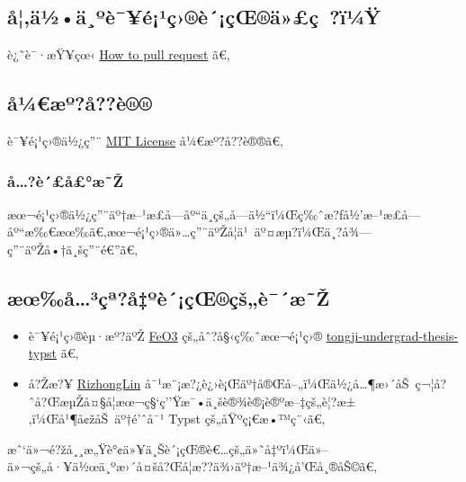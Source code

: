 \subsection{å¦‚ä½•ä¸ºè¯¥é¡¹ç›®è´¡çŒ®ä»£ç~?ï¼Ÿ}\label{uxe5uxe4uxbduxe4uxbauxe8uxe9uxb9uxe7uxe8uxe7ux153uxe4uxe7-uxefuxbcuxff}

è¿˜è¯·æŸ¥çœ‹
\href{https://github.com/typst/packages/raw/main/packages/preview/paddling-tongji-thesis/0.1.1/CONTRIBUTING.md/\#how-to-pull-request}{How
to pull request} ã€‚

\subsection{å¼€æº?å??è®®}\label{uxe5uxbcuxe6uxbauxe5uxe8}

è¯¥é¡¹ç›®ä½¿ç''¨
\href{https://github.com/typst/packages/raw/main/packages/preview/paddling-tongji-thesis/0.1.1/LICENSE}{MIT
License} å¼€æº?å??è®®ã€‚

\subsubsection{å\ldots?è´£å£°æ˜Ž}\label{uxe5uxe8uxe5uxe6ux17e}

æœ¬é¡¹ç›®ä½¿ç''¨äº†æ--¹æ­£å­---åº``ä¸­çš„å­---ä½``ï¼Œç‰ˆæ?ƒå½'æ--¹æ­£å­---åº``æ‰€æœ‰ã€‚æœ¬é¡¹ç›®ä»\ldots ç''¨äºŽå­¦ä¹~äº¤æµ?ï¼Œä¸?å¾---ç''¨äºŽå•†ä¸šç''¨é€''ã€‚

\subsection{æœ‰å\ldots³çª?å‡ºè´¡çŒ®çš„è¯´æ˜Ž}\label{uxe6ux153uxe5uxb3uxe7uxaauxe5uxbauxe8uxe7ux153uxe7ux161uxe8uxe6ux17e}

\begin{itemize}
\tightlist
\item
  è¯¥é¡¹ç›®èµ·æº?äºŽ \href{https://github.com/seashell11234455}{FeO3}
  çš„åˆ?å§‹ç‰ˆæœ¬é¡¹ç›®
  \href{https://github.com/TJ-CSCCG/tongji-undergrad-thesis-typst/tree/lky}{tongji-undergrad-thesis-typst}
  ã€‚
\item
  å?Žæ?¥ \href{https://github.com/RizhongLin}{RizhongLin}
  å¯¹æ¨¡æ?¿è¿›è¡Œäº†å®Œå--„ï¼Œä½¿å\ldots¶æ›´åŠ~ç¬¦å?ˆå?ŒæµŽå¤§å­¦æœ¬ç§`ç''Ÿæ¯•ä¸šè®¾è®¡è®ºæ--‡çš„è¦?æ±‚ï¼Œå¹¶å¢žåŠ~äº†é'ˆå¯¹
  Typst çš„åŸºç¡€æ•™ç¨‹ã€‚
\end{itemize}

æˆ`ä»¬é?žå¸¸æ„Ÿè°¢ä»¥ä¸Šè´¡çŒ®è€\ldots çš„ä»˜å‡ºï¼Œä»--ä»¬çš„å·¥ä½œä¸ºæ›´å¤šå?Œå­¦æ??ä¾›äº†æ--¹ä¾¿å'Œå¸®åŠ©ã€‚

